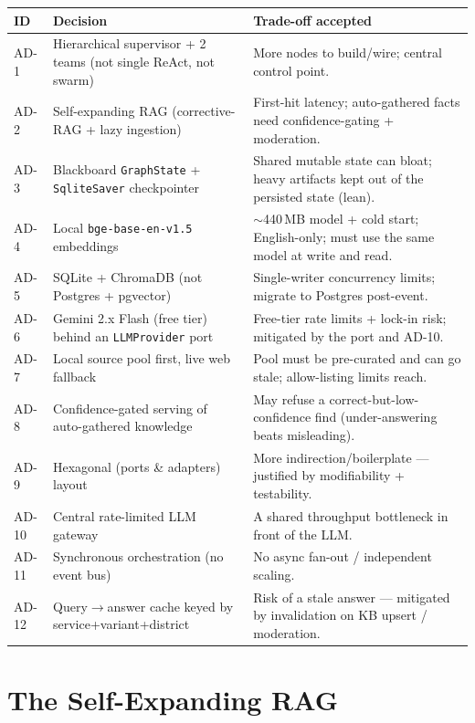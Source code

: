 \documentclass[11pt,a4paper]{article}
\begin{document}
{\footnotesize
\begin{xltabular}{\linewidth}{@{}p{0.9cm} Y Y@{}}
\toprule
\textbf{ID} & \textbf{Decision} & \textbf{Trade-off accepted} \\
\midrule
\endhead
AD-1 & Hierarchical supervisor + 2 teams (not single ReAct, not swarm) & More nodes to build/wire;
central control point. \\
AD-2 & Self-expanding RAG (corrective-RAG + lazy ingestion) & First-hit latency; auto-gathered facts
need confidence-gating + moderation. \\
AD-3 & Blackboard \texttt{GraphState} + \texttt{SqliteSaver} checkpointer & Shared mutable state can
bloat; heavy artifacts kept out of the persisted state (lean). \\
AD-4 & Local \texttt{bge-base-en-v1.5} embeddings & $\sim$440\,MB model + cold start; English-only;
must use the same model at write and read. \\
AD-5 & SQLite + ChromaDB (not Postgres + pgvector) & Single-writer concurrency limits; migrate to
Postgres post-event. \\
AD-6 & Gemini 2.x Flash (free tier) behind an \texttt{LLMProvider} port & Free-tier rate limits +
lock-in risk; mitigated by the port and AD-10. \\
AD-7 & Local source pool first, live web fallback & Pool must be pre-curated and can go stale;
allow-listing limits reach. \\
AD-8 & Confidence-gated serving of auto-gathered knowledge & May refuse a correct-but-low-confidence
find (under-answering beats misleading). \\
AD-9 & Hexagonal (ports \& adapters) layout & More indirection/boilerplate --- justified by
modifiability + testability. \\
AD-10 & Central rate-limited LLM gateway & A shared throughput bottleneck in front of the LLM. \\
AD-11 & Synchronous orchestration (no event bus) & No async fan-out / independent scaling. \\
AD-12 & Query$\to$answer cache keyed by service+variant+district & Risk of a stale answer ---
mitigated by invalidation on KB upsert / moderation. \\
\bottomrule
\end{xltabular}}

\section{The Self-Expanding RAG}
\label{sec:rag}
\end{document}
